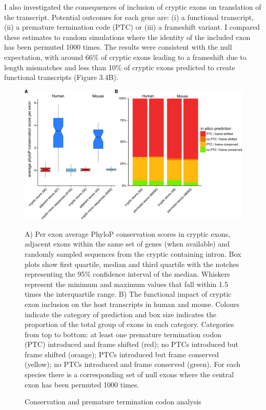 I also investigated the consequences of inclusion of cryptic exons on translation of the transcript. Potential outcomes for each gene are: (i) a functional transcript, (ii) a premature termination code (PTC) or (iii) a frameshift variant. I compared these estimates to random simulations where the identity of the included exon has been permuted 1000 times. The results were consistent with the null expectation, with around 66\% of cryptic exons leading to a frameshift due to length mismatches and less than 10\% of cryptic exons predicted to create functional transcripts (Figure 3.4B).

\begin{figure}[h!]
	  \begin{center}
		\includegraphics[width=14cm]{Figures/03_cryptic_exons/Figure_4_conservation_poison.png}
	\end{center}
	\caption{Conservation and premature termination codon analysis} 
		A) Per exon average PhyloP conservation scores in cryptic exons, adjacent exons within the same set of genes (when available) and randomly sampled sequences from the cryptic containing intron. Box plots show first quartile, median and third quartile with the notches representing the 95\% confidence interval of the median. Whiskers represent the minimum and maximum values that fall within 1.5 times the interquartile range. B) The functional impact of cryptic exon inclusion on the host transcripts in human and mouse. Colours indicate the category of prediction and box size indicates the proportion of the total group of exons in each category. Categories from top to bottom: at least one premature termination codon (PTC) introduced and frame shifted (red); no PTCs introduced but frame shifted (orange); PTCs introduced but frame conserved (yellow); no PTCs introduced and frame conserved (green). For each species there is a corresponding set of null exons where the central exon has been permuted 1000 times.
\end{figure}


